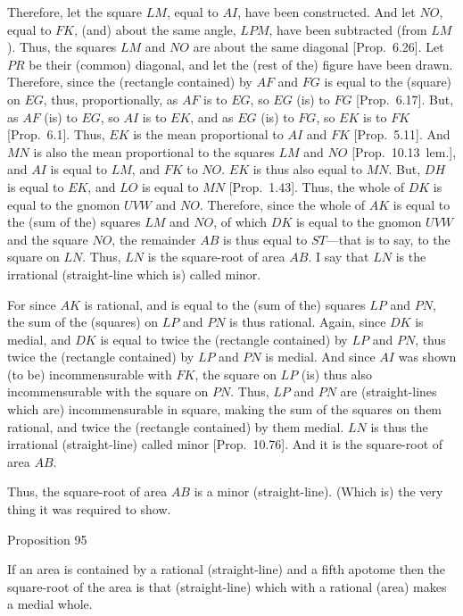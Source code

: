 Therefore, let the square $LM$, equal  to $AI$, have been constructed. And let $NO$, equal to $FK$, (and) about the same angle, $LPM$,  have been subtracted (from $LM$). Thus, the squares $LM$ and $NO$ are about the
same diagonal [Prop.~6.26]. Let $PR$ be their (common) diagonal, and let the (rest of the) figure have been drawn. Therefore, since
the (rectangle contained) by $AF$ and $FG$ is equal to the (square) on $EG$, thus, proportionally, as $AF$ is to $EG$, so $EG$ (is) to $FG$
[Prop.~6.17]. 
But, as $AF$ (is) to $EG$, so
$AI$ is to $EK$, and as $EG$ (is) to $FG$, so $EK$ is to $FK$ [Prop.~6.1]. Thus, $EK$ is the mean proportional to
$AI$ and $FK$ [Prop.~5.11]. And $MN$ is also the mean proportional to the squares $LM$
and $NO$ [Prop.~10.13~lem.], and $AI$ is equal to $LM$, and $FK$ to $NO$. $EK$ is thus also equal to $MN$. But, $DH$ is equal to $EK$, and $LO$ is equal to $MN$ [Prop.~1.43]. 
Thus, the whole of $DK$ is equal to the gnomon $UVW$ and $NO$.
Therefore, since the whole of $AK$ is equal to the (sum of the) squares $LM$ and
$NO$, of which $DK$ is equal to the gnomon $UVW$ and the square
$NO$, the remainder $AB$ is thus equal to $ST$---that is to say, to the
square on $LN$. Thus, $LN$ is the square-root of area $AB$. I say
that $LN$ is the irrational (straight-line which is) called minor.

For since $AK$ is rational, and is equal to the (sum of the) squares $LP$ and $PN$,
the sum of the (squares) on $LP$ and $PN$ is thus rational. Again, since
$DK$ is medial, and $DK$ is equal to twice the (rectangle contained)
by $LP$ and $PN$, thus twice the (rectangle contained) by $LP$
and $PN$ is medial. And since $AI$ was shown (to be) incommensurable
with $FK$, the square on $LP$ (is) thus also incommensurable with
the square on $PN$. Thus, $LP$ and $PN$ are (straight-lines which are) incommensurable in square,
making the sum of the squares on them rational, and twice the (rectangle
contained) by them medial. $LN$ is thus the irrational (straight-line)
called minor [Prop.~10.76]. And it is
the square-root of area $AB$.

Thus, the square-root of area $AB$ is a minor (straight-line). (Which is)
the very thing it was required to show.


\begin{center}
{\large Proposition 95}
\end{center}

If an area is contained by a rational (straight-line)
and a fifth apotome then the square-root of the area is that (straight-line) which with a rational (area) makes a medial whole.

